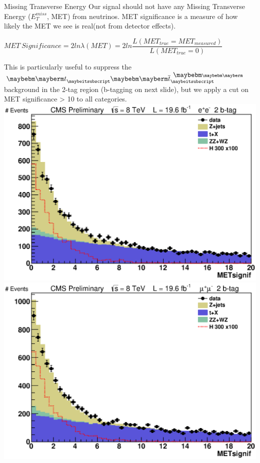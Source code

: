 \begin{frame}{Missing Transverse Energy}
\footnotesize
Our signal should not have any Missing Transverse Energy ($E_T^{miss}$, MET) from neutrinos.
MET significance is a measure of how likely the MET we see is real(not from detector effects).\\
\begin{block}{}
\begin{center}
$MET\ Significance = 2ln\lambda(MET) = 2ln \dfrac{L(MET_{true} = MET_{measured})}{L(MET_{true} = 0)}$
\end{center}
\end{block}

This is particularly useful to suppress the $\Pqt \Paqt$ background in the 2-tag region (b-tagging on next slide), but we apply a cut on MET significance > 10 to all categories.  
\\
\includegraphics[width=0.5\linewidth]{images/preselection/2/el/METsignif.eps}
\includegraphics[width=0.5\linewidth]{images/preselection/2/mu/METsignif.eps}
\end{frame}

















